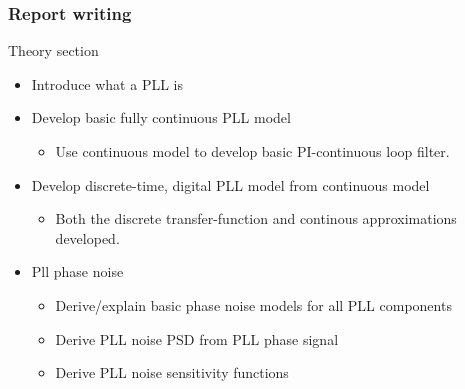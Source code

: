\documentclass[t, screen, aspectratio=43]{beamer}
\begin{document}
\begin{frame}
	\frametitle{Report writing}
	\begin{block}{Theory section}
		\begin{itemize}
			\scriptsize
			\item Introduce what a PLL is
			\item Develop basic fully continuous PLL model
			\begin{itemize}
				\scriptsize
				\item Use continuous model to develop basic PI-continuous loop filter.
			\end{itemize}
			\item Develop discrete-time, digital PLL model from continuous model
			\begin{itemize}
				\scriptsize
				\item Both the discrete transfer-function and continous approximations developed.
			\end{itemize}
			\item Pll phase noise
			\begin{itemize}
				\scriptsize 
				\item Derive/explain basic phase noise models for all PLL components
				\item Derive PLL noise PSD from PLL phase signal
				\item Derive PLL noise sensitivity functions
			\end{itemize}
		\end{itemize}    
	\end{block}
\end{frame}
\end{document}
